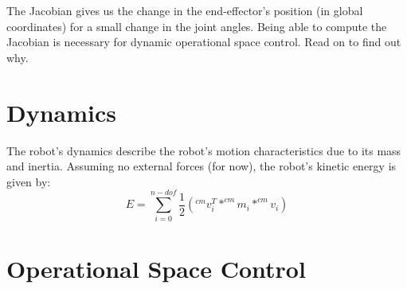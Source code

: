 \documentclass[12pt]{article}
\begin{document}
The Jacobian gives us the change in the end-effector's position (in global coordinates) for a small
change in the joint angles. Being able to compute the Jacobian is necessary for dynamic operational
space control. Read on to find out why.

\section{Dynamics}
The robot's dynamics describe the robot's motion characteristics due to its mass and inertia. 
Assuming no external forces (for now), the robot's kinetic energy is given by:
\begin{equation}
  E = \sum_{i=0}^{n-dof} \frac{1}{2} (^{cm}v_i^T * ^{cm} m_i * ^{cm} v_i)
\end{equation}


\section{Operational Space Control}
\end{document}
